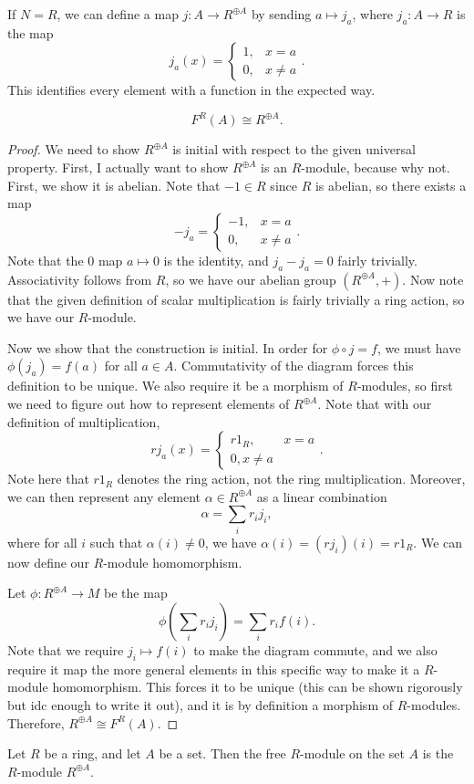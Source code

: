 If $N=R$, we can define a map $j : A \to R ^{\oplus A}$ by sending $a\mapsto j_a$, where $j_a : A \to R$ is the map
\[
	j_a(x) =
	\begin{cases}
		1,& x=a\\
		0,& x\neq a
	\end{cases}
.\]
This identifies  every element with a function in the expected way.
\begin{proposition}\label{prp:3.6.3}
	\[
		F^R(A)\cong R ^{\oplus A}
	.\]
\end{proposition}
\begin{proof}
	We need to show $R ^{\oplus A}$ is initial with respect to the given universal property. First, I actually want to show $R ^{\oplus A}$ is an $R$-module, because why not. First, we show it is abelian. Note that $-1\in R$ since $R$ is abelian, so there exists a map
	\[
		-j_a =
		\begin{cases}
			-1,&x=a\\
			0,&x\neq a
		\end{cases}
	.\]
	Note that the 0 map $a\mapsto 0$ is the identity, and $j_a-j_a=0$ fairly trivially. Associativity follows from $R$, so we have our abelian group $(R ^{\oplus A},+)$. Now note that the given definition of scalar multiplication is fairly trivially a ring action, so we have our $R$-module.

	Now we show that the construction is initial. In order for $\phi \circ j=f$, we must have $\phi (j_a)=f(a)$ for all $a\in A$. Commutativity of the diagram forces this definition to be unique. We also require it be a morphism of $R$-modules, so first we need to figure out how to represent elements of $R^{\oplus A}$. Note that with our definition of multiplication,
	\[
		rj_a(x) = 
		\begin{cases}
			r1_R,&x=a\\
			0, x\neq a
		\end{cases}
	.\]
	Note here that $r1_R$ denotes the ring action, not the ring multiplication. Moreover, we can then represent any element $\alpha \in R^{\oplus A}$ as a linear combination
	\[
		\alpha = \sum_{i} r_i j_i
	,\]
	where for all $i$ such that $\alpha (i)\neq 0$, we have $\alpha (i)=(rj_i)(i)=r1_R$. We can now define our $R$-module homomorphism.

	Let $\phi : R^{\oplus A} \to M$ be the map
	\[
		\phi \left( \sum_{i} r_ij_i \right) =\sum_{i} r_i f(i)
	.\]
	Note that we require $j_i \mapsto f(i)$ to make the diagram commute, and we also require it map the more general elements in this specific way to make it a $R$-module homomorphism. This forces it to be unique (this can be shown rigorously but idc enough to write it out), and it is by definition a morphism of $R$-modules. Therefore, $R^{\oplus A}\cong F^R(A)$.
\end{proof}
\begin{definition}\label{dfn:3.6.1}
	Let $R$ be a ring, and let $A$ be a set. Then the free $R$-module on the set $A$ is the $R$-module $R^{\oplus A}$.
\end{definition}

